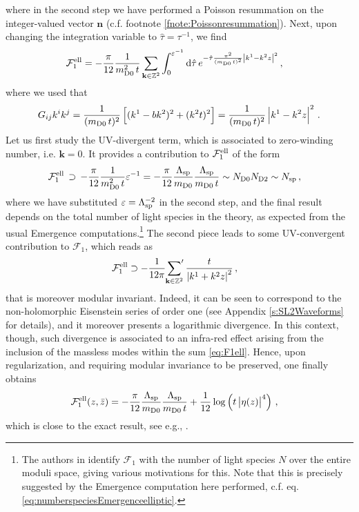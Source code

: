%
where in the second step we have performed a Poisson resummation on the integer-valued vector $\mathbf{n}$ (c.f. footnote \ref{fnote:Poissonresummation}). Next, upon changing the integration variable to $\hat \tau=\tau^{-1}$, we find
%
\begin{align}
	\mathcal{F}^{\rm ell}_{1}&= -\frac{\pi}{12} \frac{1}{m_{\rm D0}^2\, t} \sum_{\mathbf{k}\in \mathbb{Z}^2} \int_0^{\varepsilon^{-1}} {\rm d} \hat \tau\, e^{-\hat \tau \frac{\pi^2}{(m_{\rm D0}\, t)^2} \left| k^1 -k^2 z\right|^2}\, ,
\end{align}
%
where we used that
%
\begin{align}
	G_{ij}k^i k^j= \frac{1}{(m_{\rm D0}\, t)^2} \left[(k^1-b k^2)^2+(k^2 t)^2\right] = \frac{1}{(m_{\rm D0}\, t)^2} \left| k^1 -k^2 z\right|^2\, .
\end{align}
%
Let us first study the UV-divergent term, which is associated to zero-winding number, i.e. $\mathbf{k}=0$. It provides a contribution to $\mathcal{F}^{\rm ell}_{1}$ of the form
%
\begin{align}\label{eq:numberspeciesEmergenceelliptic}
	\mathcal{F}^{\rm ell}_{1}&\, \supset\, -\frac{\pi}{12} \frac{1}{m_{\rm D0}^2\, t} \varepsilon^{-1} = -\frac{\pi}{12} \frac{\Lambda_{\rm sp}}{m_{\rm D0}} \frac{\Lambda_{\rm sp}}{m_{\rm D0}\, t} \sim N_{\rm D0} N_{\rm D2} \sim N_{\rm sp}\, ,
\end{align}
%
where we have substituted $\varepsilon=\Lambda_{\text{sp}}^{-2}$ in the second step, and the final result depends on the total number of light species in the theory, as expected from the usual Emergence computations.\footnote{The authors in \cite{vandeHeisteeg:2022btw} identify $\mathcal{F}_1$ with the number of light species $N$ over the entire moduli space, giving various motivations for this. Note that this is precisely suggested by the Emergence computation here performed, c.f. eq. \eqref{eq:numberspeciesEmergenceelliptic}.} The second piece leads to some UV-convergent contribution to $\mathcal{F}_1$, which reads as
%
\begin{align}
	\mathcal{F}^{\rm ell}_{1}& \supset -\frac{1}{12 \pi} \sideset{}{'}\sum_{\mathbf{k} \in \mathbb{Z}^2} \frac{t}{\left| k^1+k^2 z\right|^{2}}\, ,
\end{align}
%
that is moreover modular invariant. Indeed, it can be seen to correspond to the non-holomorphic Eisenstein series of order one (see Appendix \ref{s:SL2Waveforms} for details), and it moreover presents a logarithmic divergence. In this context, though, such divergence is associated to an infra-red effect arising from the inclusion of the massless modes within the sum \eqref{eq:F1ell}. Hence, upon regularization, and requiring modular invariance to be preserved, one finally obtains
%
\begin{align}
	\mathcal{F}^{\rm ell}_{1} (z,\bar z)& = -\frac{\pi}{12} \frac{\Lambda_{\rm sp}}{m_{\rm D0}} \frac{\Lambda_{\rm sp}}{m_{\rm D0}\, t} + \frac{1}{12} \log \left( t \left| \eta(z)\right|^4\right)\, ,
\end{align}
%
which is close to the exact result, see e.g., \cite{Bershadsky:1993ta, vandeHeisteeg:2023dlw}.

